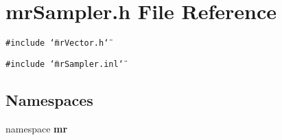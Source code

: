 \section{mr\-Sampler.h File Reference}
\label{mrSampler_8h}
{\tt \#include \char`\"{}mr\-Vector.h\char`\"{}}\par
{\tt \#include \char`\"{}mr\-Sampler.inl\char`\"{}}\par
\subsection*{Namespaces}
\begin{CompactItemize}
\item 
namespace {\bf mr}
\end{CompactItemize}
